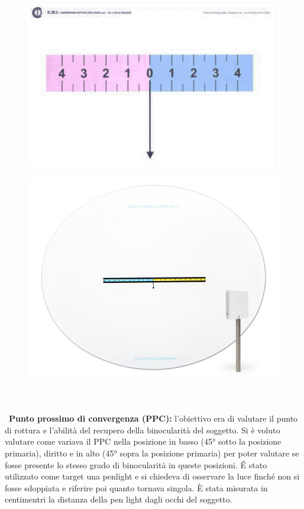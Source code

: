 \begin{figure}[h!]
\centering
\begin{minipage}{.5\textwidth}
  \centering
  \includegraphics[scale=0.15]{source/immagini/foria_lontano.png}
  \label{fig:test1}
\end{minipage}%
\begin{minipage}{.5\textwidth}
  \centering
  \includegraphics[scale=0.41]{source/immagini/foria_vicino.jpg}
  \label{fig:test2}
\end{minipage}
\end{figure}
\\\ \\\
\textbf{Punto prossimo di convergenza (PPC):} l’obiettivo era di valutare il punto di rottura e l’abilità del recupero della binocularità del soggetto. Si è voluto valutare come variava il PPC nella posizione in basso (45° sotto la posizione primaria), diritto e in alto (45° sopra la posizione primaria) per poter valutare se fosse presente lo stesso grado di binocularità in queste posizioni. É stato utilizzato come target una penlight e si chiedeva di osservare la luce finché non si fosse sdoppiata e riferire poi quanto tornava singola. È stata misurata in centimentri la distanza della pen light dagli occhi del soggetto. 
